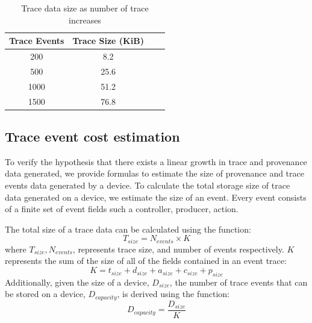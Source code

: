 \begin{table}[!b]
\caption{Trace data size as number of trace increases }
\label{table:prov_growth}
\begin{center}
 \begin{tabular}{||c| c| c| c||} 
 \hline
 \textbf{Trace Events} & \textbf{Trace Size (KiB)} \\ [0.5ex] 
 \hline\hline
 200 & 8.2 \\ 
 \hline
 500 & 25.6 \\
 \hline
 1000 & 51.2 \\
 \hline
 1500 & 76.8 \\
 \hline
\end{tabular}

\end{center}
\end{table}



\subsection{Trace event cost estimation}
To verify the hypothesis that there exists a linear growth in trace and provenance data generated, we provide formulas to estimate the size of provenance and trace events data generated by a device. To calculate the total storage size of trace data generated on a device, we estimate the size of an event. Every event consists of a finite set of event fields such a controller, producer, action. 


The total size of a trace data can be calculated using the function:  \[T_{size} = N_{events} \times K\] where $T_{size}, N_{events}$, represents trace size, and number of events respectively.  $K$ represents the sum of the size of all of the fields contained in an event trace:  \[ K = t_{size} + d_{size}+ a_{size} + c_{size} + p_{size}\] Additionally, given the size of a device, $D_{size}$, the number of trace events that can be stored on a device, $D_{capacity}$, is derived using the function:
\[ D_{capacity} = \frac{D_{size}}{K} \]




